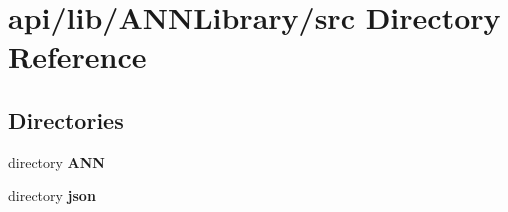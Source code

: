 \section{api/lib/\+A\+N\+N\+Library/src Directory Reference}
\label{dir_5cba91bc3f70e5727d263d14bf8dceec}
\subsection*{Directories}
\begin{DoxyCompactItemize}
\item 
directory {\bf A\+N\+N}
\item 
directory {\bf json}
\end{DoxyCompactItemize}
